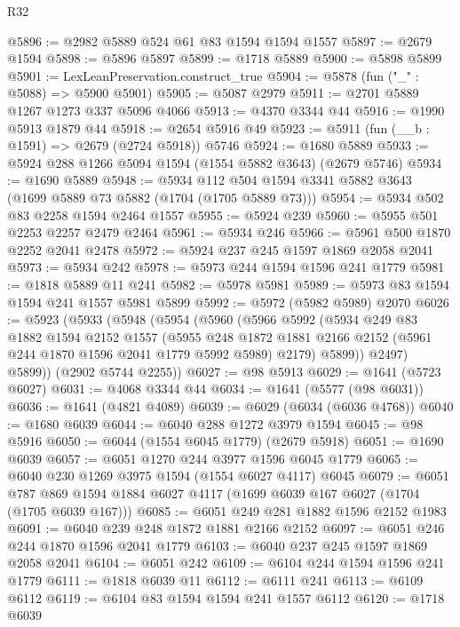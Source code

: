\begin{lexlean}{R32}
\begin{coremodule}
@5896 := @2982 @5889 @524 @61 @83 @1594 @1594 @1557
@5897 := @2679 @1594
@5898 := @5896 @5897
@5899 := @1718 @5889
@5900 := @5898 @5899
@5901 := LexLeanPreservation.construct_true
@5904 := @5878 (fun ("_" : @5088) => @5900 @5901)
@5905 := @5087 @2979
@5911 := @2701 @5889 @1267 @1273 @337 @5096 @4066
@5913 := @4370 @3344 @44
@5916 := @1990 @5913 @1879 @44
@5918 := @2654 @5916 @49
@5923 := @5911 (fun (__b : @1591) => @2679 (@2724 @5918)) @5746
@5924 := @1680 @5889
@5933 := @5924 @288 @1266 @5094 @1594 (@1554 @5882 @3643) (@2679 @5746)
@5934 := @1690 @5889
@5948 := @5934 @112 @504 @1594 @3341 @5882 @3643 (@1699 @5889 @73 @5882 (@1704 (@1705 @5889 @73)))
@5954 := @5934 @502 @83 @2258 @1594 @2464 @1557
@5955 := @5924 @239
@5960 := @5955 @501 @2253 @2257 @2479 @2464
@5961 := @5934 @246
@5966 := @5961 @500 @1870 @2252 @2041 @2478
@5972 := @5924 @237 @245 @1597 @1869 @2058 @2041
@5973 := @5934 @242
@5978 := @5973 @244 @1594 @1596 @241 @1779
@5981 := @1818 @5889 @11 @241
@5982 := @5978 @5981
@5989 := @5973 @83 @1594 @1594 @241 @1557 @5981 @5899
@5992 := @5972 (@5982 @5989) @2070
@6026 := @5923
    (@5933
      (@5948
        (@5954
          (@5960
            (@5966
              @5992
              (@5934
                @249
                @83
                @1882
                @1594
                @2152
                @1557
                (@5955
                  @248
                  @1872
                  @1881
                  @2166
                  @2152
                  (@5961 @244 @1870 @1596 @2041 @1779 @5992 @5989)
                  @2179)
                @5899))
            @2497)
          @5899))
      (@2902 @5744 @2255))
@6027 := @98 @5913
@6029 := @1641 (@5723 @6027)
@6031 := @4068 @3344 @44
@6034 := @1641 (@5577 (@98 @6031))
@6036 := @1641 (@4821 @4089)
@6039 := @6029 (@6034 (@6036 @4768))
@6040 := @1680 @6039
@6044 := @6040 @288 @1272 @3979 @1594
@6045 := @98 @5916
@6050 := @6044 (@1554 @6045 @1779) (@2679 @5918)
@6051 := @1690 @6039
@6057 := @6051 @1270 @244 @3977 @1596 @6045 @1779
@6065 := @6040 @230 @1269 @3975 @1594 (@1554 @6027 @4117) @6045
@6079 := @6051 @787 @869 @1594 @1884 @6027 @4117 (@1699 @6039 @167 @6027 (@1704 (@1705 @6039 @167)))
@6085 := @6051 @249 @281 @1882 @1596 @2152 @1983
@6091 := @6040 @239 @248 @1872 @1881 @2166 @2152
@6097 := @6051 @246 @244 @1870 @1596 @2041 @1779
@6103 := @6040 @237 @245 @1597 @1869 @2058 @2041
@6104 := @6051 @242
@6109 := @6104 @244 @1594 @1596 @241 @1779
@6111 := @1818 @6039 @11
@6112 := @6111 @241
@6113 := @6109 @6112
@6119 := @6104 @83 @1594 @1594 @241 @1557 @6112
@6120 := @1718 @6039

\end{coremodule}
\end{lexlean}
